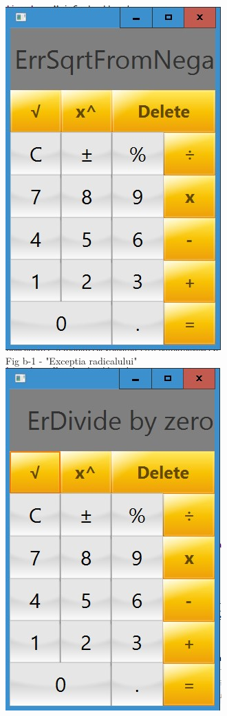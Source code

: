 \begin{center}
\includegraphics[scale=0.85]{b-1} \\
Fig b-1 - "Exceptia radicalului" \\
\vspace{10 mm}
\includegraphics[scale=0.85]{b-2} \\

\end{center}
